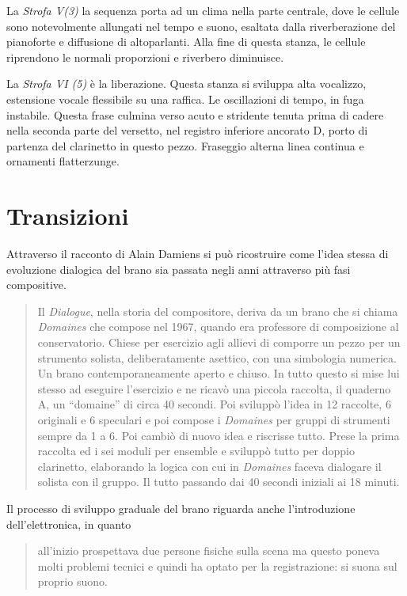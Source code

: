 La \emph{Strofa V(3)} la sequenza porta ad un clima nella parte centrale, dove le cellule sono notevolmente allungati nel tempo e suono, esaltata dalla riverberazione del pianoforte e diffusione di altoparlanti. Alla fine di questa stanza, le cellule riprendono le normali proporzioni e riverbero diminuisce.

La \emph{Strofa VI (5)} è la liberazione. Questa stanza si sviluppa alta vocalizzo, estensione vocale flessibile su una raffica. Le oscillazioni di tempo, in fuga instabile. Questa frase culmina verso acuto e stridente tenuta prima di cadere nella seconda parte del versetto, nel registro inferiore ancorato D, porto di partenza del clarinetto in questo pezzo. Fraseggio alterna linea continua e ornamenti flatterzunge.

\section*{Transizioni}

Attraverso il racconto di Alain Damiens si può ricostruire come l'idea stessa di evoluzione dialogica del brano sia passata negli anni attraverso più fasi compositive.

\begin{quote}
{\small
Il \emph{Dialogue}, nella storia del compositore, deriva da un brano che si chiama \emph{Domaines} che compose nel 1967, quando era professore di composizione al conservatorio. Chiese per esercizio agli allievi di comporre un pezzo per un strumento solista, deliberatamente asettico, con una simbologia numerica. Un brano contemporaneamente aperto e chiuso. In tutto questo si mise lui stesso ad eseguire l'esercizio e ne ricavò una piccola raccolta, il quaderno A, un “domaine” di circa 40 secondi. Poi sviluppò l'idea in 12 raccolte, 6 originali e 6 speculari e poi compose i \emph{Domaines} per gruppi di strumenti sempre da 1 a 6. Poi cambiò di nuovo idea e riscrisse tutto. Prese la prima raccolta ed i sei moduli per ensemble e sviluppò tutto per doppio clarinetto, elaborando la logica con cui in \emph{Domaines} faceva dialogare il solista con il gruppo. Il tutto passando dai 40 secondi iniziali ai 18 minuti.
}
\end{quote}

Il processo di sviluppo graduale del brano riguarda anche l'introduzione dell'elettronica, in quanto
\begin{quote}
{\small
all'inizio prospettava due persone fisiche sulla scena ma questo poneva molti problemi tecnici e quindi ha optato per la registrazione: si suona sul proprio suono.
}
\end{quote}

